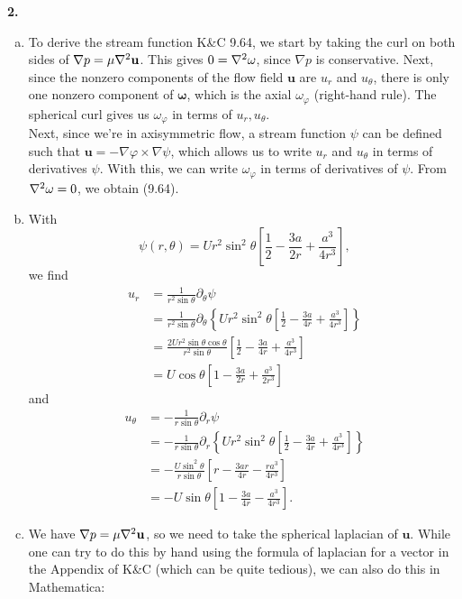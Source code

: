 \documentclass[11pt]{article}
\newcommand{\f}[2]{\frac{#1}{#2}}
\newcommand{\p}{\partial}%
\begin{document}
\noindent \textbf{2.}
\begin{enumerate}[(a)]
	\item To derive the stream function K\&C 9.64, we start by taking the curl on both sides of $\nabla p = \mu \laplacian \mathbf{u}$. This gives $0 = \laplacian \mathbf\omega$, since $\nabla p$ is conservative. Next, since the nonzero components of the flow field $\mathbf{u}$ are $u_r$ and $u_\theta$, there is only one nonzero component of $\mathbf\omega$, which is the axial $\omega_\varphi$ (right-hand rule). The spherical curl gives us $\omega_\varphi$ in terms of $u_r,u_\theta$. \\
	
	Next, since we're in axisymmetric flow, a stream function $\psi$ can be defined  such that $\mathbf{u} = -\nabla \varphi \times \nabla \psi$, which allows us to write $u_r$ and $u_\theta$ in terms of derivatives $\psi$. With this, we can write $\omega_\varphi$ in terms of derivatives of $\psi$. From $\laplacian \omega = 0$, we obtain (9.64). 
	
	\item With 
	\begin{equation*}
	\psi(r,\theta) = Ur^2 \sin^2\theta \left[ \f{1}{2} - \f{3a}{2r} + \f{a^3}{4r^3} \right],
	\end{equation*}
	we find 
	\begin{align*}
	u_r 
	&= \f{1}{r^2\sin\theta}\p_\theta \psi\\
	&= \f{1}{r^2\sin\theta} \p_\theta\left\{ Ur^2 \sin^2\theta \left[ \f{1}{2} - \f{3a}{4r} + \f{a^3}{4r^3} \right] \right\}\\
	&= \f{2Ur^2\sin\theta\cos\theta}{r^2\sin\theta}\left[ \f{1}{2} - \f{3a}{4r} + \f{a^3}{4r^3} \right] \\
	&= U\cos\theta \left[ 1 - \f{3a}{2r} + \f{a^3}{2r^3} \right]
	\end{align*}
	and
	\begin{align*}
	u_\theta 
	&= -\f{1}{r\sin\theta}\p_r \psi\\
	&= -\f{1}{r\sin\theta}\p_r \left\{ Ur^2 \sin^2\theta \left[ \f{1}{2} - \f{3a}{4r} + \f{a^3}{4r^3} \right] \right\}\\
	&= -\f{U\sin^2\theta}{r\sin\theta}\left[ r - \f{3ar}{4r} - \f{ra^3}{4r^3}  \right]\\
	&= -U\sin\theta\left[ 1 - \f{3a}{4r} - \f{a^3}{4r^3}  \right].
	\end{align*}
	
	
	\item We have $\nabla p = \mu\laplacian \mathbf{u}$, so we need to take the spherical laplacian of $\mathbf{u}$. While one can try to do this by hand using the formula of laplacian for a vector in the Appendix of K\&C (which can be quite tedious), we can also do this in Mathematica:


\end{enumerate}
\end{document}
